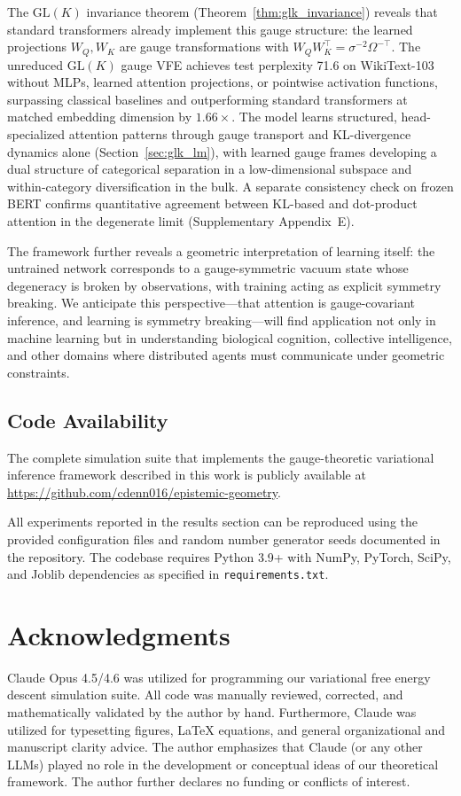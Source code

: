 \documentclass[twoside,11pt]{article}
\begin{document}
The $\mathrm{GL}(K)$ invariance theorem (Theorem~\ref{thm:glk_invariance}) reveals that standard transformers already implement this gauge structure: the learned projections $W_Q, W_K$ are gauge transformations with $W_Q W_K^\top = \sigma^{-2}\Omega^{-\top}$. The unreduced $\mathrm{GL}(K)$ gauge VFE achieves test perplexity 71.6 on WikiText-103 without MLPs, learned attention projections, or pointwise activation functions, surpassing classical baselines and outperforming standard transformers at matched embedding dimension by $1.66\times$. The model learns structured, head-specialized attention patterns through gauge transport and KL-divergence dynamics alone (Section~\ref{sec:glk_lm}), with learned gauge frames developing a dual structure of categorical separation in a low-dimensional subspace and within-category diversification in the bulk. A separate consistency check on frozen BERT confirms quantitative agreement between KL-based and dot-product attention in the degenerate limit (Supplementary Appendix~E).

The framework further reveals a geometric interpretation of learning itself: the untrained network corresponds to a gauge-symmetric vacuum state whose degeneracy is broken by observations, with training acting as explicit symmetry breaking. We anticipate this perspective---that attention is gauge-covariant inference, and learning is symmetry breaking---will find application not only in machine learning but in understanding biological cognition, collective intelligence, and other domains where distributed agents must communicate under geometric constraints.


\subsection{Code Availability}
The complete simulation suite that implements the gauge-theoretic variational inference framework described in this work is publicly available at \href{https://github.com/cdenn016/epistemic-geometry}{https://github.com/cdenn016/epistemic-geometry}.


All experiments reported in the results section can be reproduced using the provided configuration files and random number generator seeds documented in the repository. The codebase requires Python 3.9+ with NumPy, PyTorch, SciPy, and Joblib dependencies as specified in \texttt{requirements.txt}.



\section*{Acknowledgments}
Claude Opus 4.5/4.6 was utilized for programming our variational free energy descent simulation suite.  All code was manually reviewed, corrected, and mathematically validated by the author by hand.  Furthermore, Claude was utilized for typesetting figures, LaTeX equations, and general organizational and manuscript clarity advice.  The author emphasizes that Claude (or any other LLMs) played no role in the development or conceptual ideas of our theoretical framework. The author further declares no funding or conflicts of interest.
\end{document}
